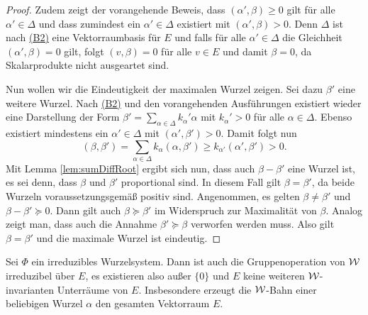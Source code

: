 \begin{proof}
  Zudem zeigt der vorangehende Beweis, dass $(\alpha', \beta) \geq 0$ gilt für alle $\alpha' \in \Delta$ und dass zumindest ein $\alpha' \in \Delta$ existiert mit $(\alpha', \beta) > 0$.
    Denn $\Delta$ ist nach \hyperref[it:B2]{(B2)} eine Vektorraumbasis für $E$ und falls für alle $\alpha' \in \Delta$ die Gleichheit $(\alpha', \beta) = 0$ gilt, folgt $(v, \beta) = 0$ für alle $v \in E$ und damit $\beta = 0$, da Skalarprodukte nicht ausgeartet sind.

  Nun wollen wir die Eindeutigkeit der maximalen Wurzel zeigen.
  Sei dazu $\beta'$ eine weitere Wurzel.
  Nach \hyperref[it:B2]{(B2)} und den vorangehenden Ausführungen existiert wieder eine Darstellung der Form $\beta' = \sum_{\alpha \in \Delta} k_\alpha' \alpha$ mit $k_\alpha' > 0$ für alle $\alpha \in \Delta$.
  Ebenso existiert mindestens ein $\alpha' \in \Delta$ mit $(\alpha', \beta') > 0$.
  Damit folgt nun
  \begin{displaymath}
    (\beta, \beta') = \sum_{\alpha \in \Delta} k_\alpha (\alpha, \beta') \geq k_{\alpha'} (\alpha', \beta') > 0.
  \end{displaymath}
  Mit Lemma \ref{lem:sumDiffRoot} ergibt sich nun, dass auch $\beta - \beta'$ eine Wurzel ist, es sei denn, dass $\beta$ und $\beta'$ proportional sind. 
  In diesem Fall gilt $\beta = \beta'$, da beide Wurzeln voraussetzungsgemäß positiv sind.
  Angenommen, es gelten $\beta \neq \beta'$ und $\beta - \beta' \succeq 0$.
  Dann gilt auch $\beta \succeq \beta'$ im Widerspruch zur Maximalität von $\beta$.
  Analog zeigt man, dass auch die Annahme $\beta' \succeq \beta$ verworfen werden muss.
  Also gilt $\beta = \beta'$ und die maximale Wurzel ist eindeutig.
\end{proof}

\begin{lem}
  \label{lem:irreducibleGroupOp}
  Sei $\Phi$ ein irreduzibles Wurzelsystem.
  Dann ist auch die Gruppenoperation von $\mathcal{W}$ irreduzibel über $E$, es existieren also außer $\{0\}$ und $E$ keine weiteren $\mathcal{W}$\hyp{}invarianten Unterräume von $E$.
  Insbesondere erzeugt die $\mathcal{W}$\hyp{}Bahn einer beliebigen Wurzel $\alpha$ den gesamten Vektorraum $E$.
\end{lem}

